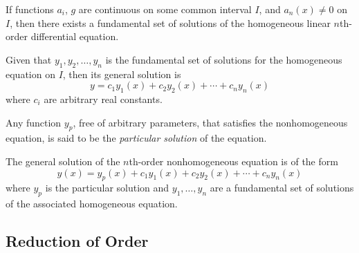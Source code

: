 \begin{theorem}
    If functions $a_i$, $g$ are continuous on some common interval $I$, and $a_n(x) \ne 0$ on $I$, then there exists a fundamental set of solutions of the homogeneous linear $n$th-order differential equation.
\end{theorem}

Given that $y_1, y_2, \ldots, y_n$ is the fundamental set of solutions for the homogeneous equation on $I$, then its general solution is
\[
    y = c_1 y_1(x) + c_2 y_2(x) + \cdots + c_n y_n(x)
\]
where $c_i$ are arbitrary real constants.

Any function $y_p$, free of arbitrary parameters, that satisfies the nonhomogeneous equation, is said to be the \textit{particular solution} of the equation.

The general solution of the $n$th-order nonhomogeneous equation is of the form
\[
    y(x) = y_p(x) + c_1 y_1(x) + c_2 y_2(x) + \cdots + c_n y_n(x)
\]
where $y_p$ is the particular solution and $y_1, \ldots, y_n$ are a fundamental set of solutions of the associated homogeneous equation.

\subsection{Reduction of Order}